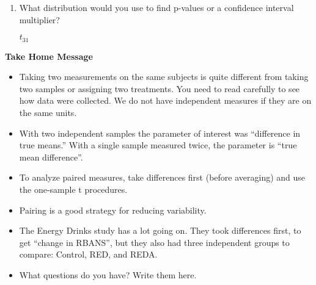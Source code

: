 \begin{enumerate}
\begin{enumerate}
\begin{key}
  {\it Take difference in weight gain (diet minus sugar) for each person.}
\end{key}
\item What distribution would you use to find p-values or
    a confidence interval multiplier?
\begin{students}
\vspace{2cm}
\end{students}

\begin{key}
  {\it $t_{31}$}
\end{key}
\end{enumerate}

\end{enumerate}


\begin{center}
  {\large\bf Take Home Message}
\end{center}
\begin{itemize}
\item Taking two measurements on the same subjects is quite different
  from taking two samples or assigning two treatments. You need to
  read carefully to see how data were collected.  We do not have
  independent measures if they are on the same units.

  \item With two independent samples the parameter of interest was
    ``difference in true means.''  With a single sample measured
    twice, the parameter is ``true mean difference''.

  \item To analyze paired measures, take differences first (before
    averaging) and use the one-sample t procedures.

  \item Pairing is a good strategy for reducing variability.

  \item The Energy Drinks study has a lot going on.  They took
    differences first, to get ``change in RBANS'', but they also had
    three independent groups to compare: Control, RED, and REDA.

  \item What  questions do you have?  Write them here.\vspace{2cm}
\end{itemize}


